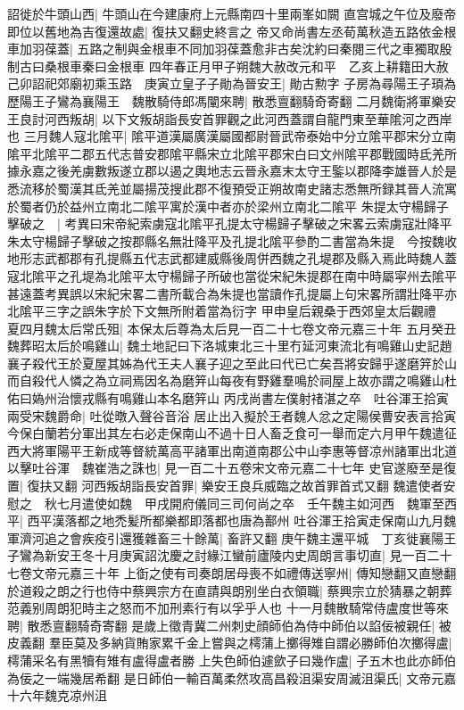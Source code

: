 詔徙於牛頭山西|{
	牛頭山在今建康府上元縣南四十里兩峯如闕}
直宫城之午位及廢帝即位以舊地為吉復還故處|{
	復扶又翻史終言之}
帝又命尚書左丞荀萬秋造五路依金根車加羽葆蓋|{
	五路之制與金根車不同加羽葆蓋愈非古矣沈約曰秦閱三代之車獨取殷制古曰桑根車秦曰金根車}
四年春正月甲子朔魏大赦改元和平　乙亥上耕籍田大赦　己卯詔祀郊廟初乘玉路　庚寅立皇子子勛為晉安王|{
	勛古勲字}
子房為尋陽王子頊為歷陽王子鸞為襄陽王　魏散騎侍郎馮闡來聘|{
	散悉亶翻騎奇寄翻}
二月魏衛將軍樂安王良討河西叛胡|{
	以下文叛胡詣長安首罪觀之此河西蓋謂自龍門東至華隂河之西岸也}
三月魏人寇北隂平|{
	隂平道漢屬廣漢屬國都尉晉武帝泰始中分立隂平郡宋分立南隂平北隂平二郡五代志普安郡隂平縣宋立北隂平郡宋白曰文州隂平郡戰國時氐羌所據永嘉之後羌虜數叛遂立郡以遏之輿地志云晉永嘉末太守王鍳以郡降李雄晉人於是悉流移於蜀漢其氐羌並屬揚茂搜此郡不復預受正朔故南史諸志悉無所録其晉人流寓於蜀者仍於益州立南北二隂平寓於漢中者亦於梁州立南北二隂平}
朱提太守楊歸子擊破之　|{
	考異曰宋帝紀索虜寇北隂平孔提太守楊歸子擊破之宋畧云索虜寇壯降平朱太守楊歸子擊破之按郡縣名無壯降平及孔提北隂平參酌二書當為朱提　今按魏收地形志武都郡有孔提縣五代志武都建威縣後周併西魏之孔堤郡及縣入焉此時魏人蓋寇北隂平之孔堤為北隂平太守楊歸子所破也當從宋紀朱提郡在南中時屬寜州去隂平甚遠蓋考異誤以宋紀宋畧二書所載合為朱提也當讀作孔提屬上句宋畧所謂壯降平亦北隂平三字之誤朱字於下文無所附着當為衍字}
甲申皇后親桑于西郊皇太后觀禮　夏四月魏太后常氏殂|{
	本保太后尊為太后見一百二十七卷文帝元嘉三十年}
五月癸丑魏葬昭太后於鳴雞山|{
	魏土地記曰下洛城東北三十里冇延河東流北有鳴雞山史記趙襄子殺代王於夏屋其姊為代王夫人襄子迎之至此曰代已亡矣吾將安歸乎遂磨笄於山而自殺代人憐之為立祠焉因名為磨笄山每夜有野雞羣鳴於祠屋上故亦謂之鳴雞山杜佑曰媯州治懷戎縣有鳴雞山本名磨笄山}
丙戌尚書左僕射禇湛之卒　吐谷渾王拾寅兩受宋魏爵命|{
	吐從暾入聲谷音浴}
居止出入擬於王者魏人忿之定陽侯曹安表言拾寅今保白蘭若分軍出其左右必走保南山不過十日人畜乏食可一舉而定六月甲午魏遣征西大將軍陽平王新成等督統萬高平諸軍出南道南郡公中山李惠等督凉州諸軍出北道以擊吐谷渾　魏崔浩之誅也|{
	見一百二十五卷宋文帝元嘉二十七年}
史官遂廢至是復置|{
	復扶又翻}
河西叛胡詣長安首罪|{
	樂安王良兵威臨之故首罪首式又翻}
魏遣使者安慰之　秋七月遣使如魏　甲戌開府儀同三司何尚之卒　壬午魏主如河西　魏軍至西平|{
	西平漢落都之地禿髪所都樂都即落都也唐為鄯州}
吐谷渾王拾寅走保南山九月魏軍濟河追之會疾疫引還獲雜畜三十餘萬|{
	畜許又翻}
庚午魏主還平城　丁亥徙襄陽王子鸞為新安王冬十月庚寅詔沈慶之討緣江蠻前廬陵内史周朗言事切直|{
	見一百二十七卷文帝元嘉三十年}
上衘之使有司奏朗居母喪不如禮傳送寧州|{
	傳知戀翻又直戀翻}
於道殺之朗之行也侍中蔡興宗方在直請與朗别坐白衣領職|{
	蔡興宗立於猜暴之朝葬范義别周朗犯時主之怒而不加刑素行有以孚乎人也}
十一月魏散騎常侍盧度世等來聘|{
	散悉亶翻騎奇寄翻}
是歲上徵青冀二州刺史顔師伯為侍中師伯以諂佞被親任|{
	被皮義翻}
羣臣莫及多納貨賄家累千金上嘗與之樗蒲上擲得雉自謂必勝師伯次擲得盧|{
	樗蒲采名有黑犢有雉有盧得盧者勝}
上失色師伯遽歛子曰幾作盧|{
	子五木也此亦師伯為佞之一端幾居希翻}
是日師伯一輸百萬柔然攻高昌殺沮渠安周滅沮渠氏|{
	文帝元嘉十六年魏克凉州沮}


